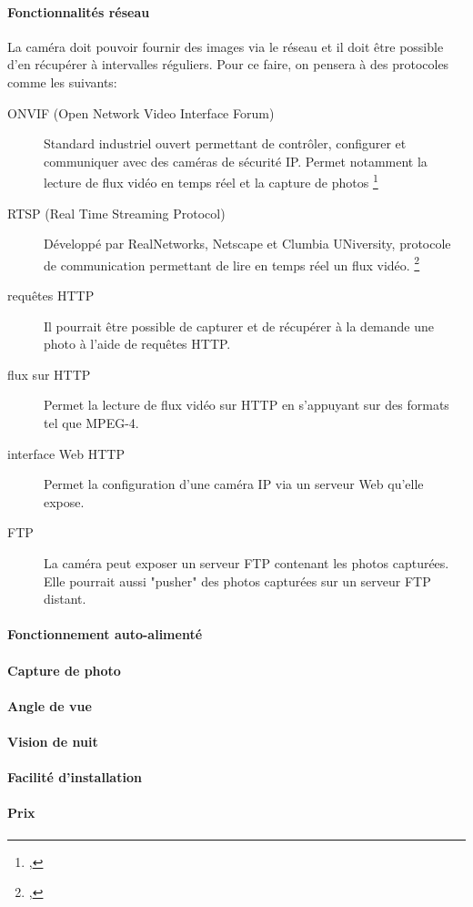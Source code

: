 \paragraph{Fonctionnalités réseau}
La caméra doit pouvoir fournir des images via le réseau et il doit être possible d'en récupérer à intervalles réguliers. Pour ce faire, on pensera à des protocoles comme les suivants: 
\begin{description}
    \item[ONVIF (Open Network Video Interface Forum)] Standard industriel ouvert permettant de contrôler, configurer et communiquer avec des caméras de sécurité IP. Permet notamment la lecture de flux vidéo en temps réel et la capture de photos \footnote{\cite{wiki:onvif}, }
    \item[RTSP (Real Time Streaming Protocol)] Développé par RealNetworks, Netscape et Clumbia UNiversity, protocole de communication permettant de lire en temps réel un flux vidéo. \footnote{\cite{wiki:RTSP}, }
    \item[requêtes HTTP] Il pourrait être possible de capturer et de récupérer à la demande une photo à l'aide de requêtes HTTP.
    \item[flux sur HTTP] Permet la lecture de flux vidéo sur HTTP en s'appuyant sur des formats tel que MPEG-4.
    \item[interface Web HTTP] Permet la configuration d'une caméra IP via un serveur Web qu'elle expose. 
    \item[FTP] La caméra peut exposer un serveur FTP contenant les photos capturées. Elle pourrait aussi "pusher" des photos capturées sur un serveur FTP distant.
\end{description}

\paragraph{Fonctionnement auto-alimenté}

\paragraph{Capture de photo}
\paragraph{Angle de vue}
\paragraph{Vision de nuit}
\paragraph{Facilité d'installation}

\paragraph{Prix}
